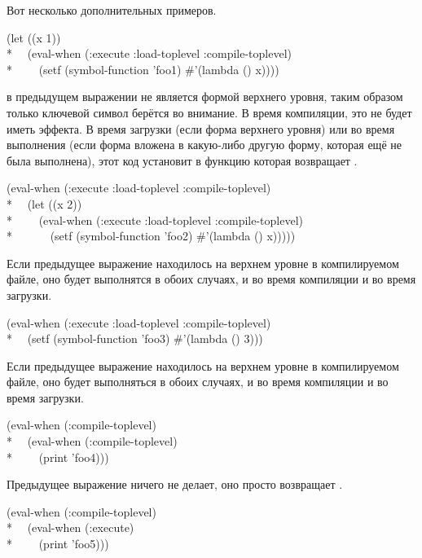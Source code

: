 \begin{newer}
\begin{defspec}
\begin{itemize}
\end{itemize}

Вот несколько дополнительных примеров.
\begin{lisp} 
(let ((x 1)) \\*
~~(eval-when (:execute :load-toplevel :compile-toplevel) \\*
~~~~(setf (symbol-function 'foo1) \#'(lambda () x))))
\end{lisp}
 в предыдущем выражении не является формой верхнего уровня, таким
образом только ключевой символ  берётся во внимание. В время
компиляции, это не будет иметь эффекта. В время загрузки (если  форма
верхнего уровня) или во время выполнения (если форма  вложена в
какую-либо другую форму, которая ещё не была выполнена), этот код установит
в  функцию которая возвращает .
\begin{lisp}
(eval-when (:execute :load-toplevel :compile-toplevel) \\*
~~(let ((x 2)) \\*
~~~~(eval-when (:execute :load-toplevel :compile-toplevel) \\*
~~~~~~(setf (symbol-function 'foo2) \#'(lambda () x)))))
\end{lisp}

Если предыдущее выражение находилось на верхнем уровне в компилируемом файле, оно
будет выполнятся в обоих случаях, и во время компиляции и во время загрузки.
\begin{lisp}
(eval-when (:execute :load-toplevel :compile-toplevel) \\*
~~(setf (symbol-function 'foo3) \#'(lambda () 3)))
\end{lisp}

Если предыдущее выражение находилось на верхнем уровне в компилируемом файле, оно
будет выполняться в обоих случаях, и во время компиляции и во время загрузки.
\begin{lisp}
(eval-when (:compile-toplevel) \\*
~~(eval-when (:compile-toplevel)  \\*
~~~~(print 'foo4)))
\end{lisp}

Предыдущее выражение ничего не делает, оно просто возвращает .

\begin{lisp}
(eval-when (:compile-toplevel)  \\*
~~(eval-when (:execute) \\*
~~~~(print 'foo5)))
\end{lisp}


\end{defspec}
\end{newer}
